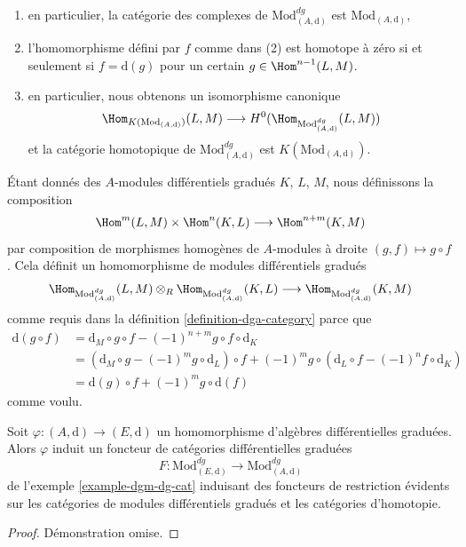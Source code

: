 \begin{example}
\begin{enumerate}
$f : L \to M[n]$ est un homomorphisme de $A$-modules différentiels gradués,
\item en particulier, la catégorie des complexes
de $\text{Mod}^{dg}_{(A, \text{d})}$ est $\text{Mod}_{(A, \text{d})}$,
\item l'homomorphisme défini par $f$ comme dans (2) est homotope à zéro
si et seulement si $f = \text{d}(g)$ pour un certain
$g \in \Hom^{n - 1}(L, M)$.
\item en particulier, nous obtenons un isomorphisme canonique
$$
\Hom_{K(\text{Mod}_{(A, \text{d})})}(L, M)
\longrightarrow
H^0(\Hom_{\text{Mod}^{dg}_{(A, \text{d})}}(L, M))
$$
et la catégorie homotopique de $\text{Mod}^{dg}_{(A, \text{d})}$
est $K(\text{Mod}_{(A, \text{d})})$.
\end{enumerate}
Étant donnés des $A$-modules différentiels gradués $K$, $L$, $M$, nous définissons
la composition
$$
\Hom^m(L, M) \times \Hom^n(K, L) \longrightarrow \Hom^{n + m}(K, M)
$$
par composition de morphismes homogènes de $A$-modules à droite $(g, f) \mapsto g \circ f$.
Cela définit un homomorphisme de modules différentiels gradués
$$
\Hom_{\text{Mod}^{dg}_{(A, \text{d})}}(L, M) \otimes_R
\Hom_{\text{Mod}^{dg}_{(A, \text{d})}}(K, L) \longrightarrow
\Hom_{\text{Mod}^{dg}_{(A, \text{d})}}(K, M)
$$
comme requis
dans la définition \ref{definition-dga-category}
parce que
\begin{align*}
\text{d}(g \circ f) & =
\text{d}_M \circ g \circ f - (-1)^{n + m} g \circ f \circ \text{d}_K \\
& =
\left(\text{d}_M \circ g - (-1)^m g \circ \text{d}_L\right) \circ f +
(-1)^m g \circ \left(\text{d}_L \circ f - (-1)^n f \circ \text{d}_K\right) \\ & =
\text{d}(g)
\circ f + (-1)^m g \circ \text{d}(f)
\end{align*}
comme voulu.
\end{example}

\begin{lemma}
\label{lemma-homomorphism-induces-dga-functor}
Soit $\varphi : (A, \text{d}) \to (E, \text{d})$ un homomorphisme
d'algèbres différentielles graduées. Alors $\varphi$ induit un foncteur de catégories
différentielles graduées
$$
F :
\text{Mod}^{dg}_{(E, \text{d})}
\longrightarrow
\text{Mod}^{dg}_{(A, \text{d})}
$$
de l'exemple \ref{example-dgm-dg-cat} induisant des foncteurs de restriction
évidents sur les catégories de modules différentiels gradués et les catégories d'homotopie.
\end{lemma}

\begin{proof}
Démonstration omise.
\end{proof}

